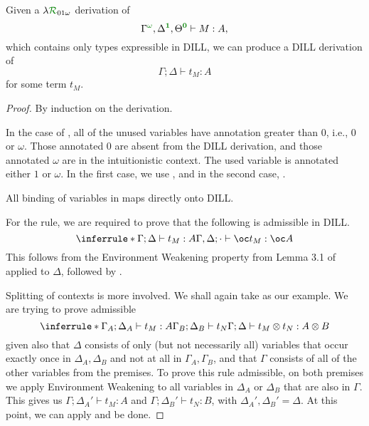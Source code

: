 \begin{proposition}
  Given a $\name_{01\omega}$ derivation of \[
    \ctx{\Gamma}{\vct \omega}, \ctx{\Delta}{\vct 1}, \ctx{\Theta}{\vct 0} \vdash
    M : A,
  \] which contains only types expressible in DILL, we can produce a DILL
  derivation of \[
    \Gamma; \Delta \vdash t_M : A
  \] for some term $t_M$.
\end{proposition}
\begin{proof}
  By induction on the derivation.

  In the case of , all of the unused variables have annotation
  greater than $0$, i.e., $0$ or $\omega$.
  Those annotated $0$ are absent from the DILL derivation, and those annotated
  $\omega$ are in the intuitionistic context.
  The used variable is annotated either $1$ or $\omega$.
  In the first case, we use , and in the second case,
  .

  All binding of variables in \name{} maps directly onto DILL.

  For the  rule, we are required to prove that the
  following is admissible in DILL.
  \[
    \inferrule*
    {\Gamma; \Delta \vdash t_M : A}
    {\Gamma, \Delta; \cdot \vdash \oc t_M : \oc A}
  \]
  This follows from the Environment Weakening property from Lemma 3.1 of
  \cite{Barber1996} applied to $\Delta$, followed by .

  Splitting of contexts is more involved.
  We shall again take  as our example.
  We are trying to prove admissible \[
    \inferrule*
    {\Gamma_A; \Delta_A \vdash t_M : A \\ \Gamma_B; \Delta_B \vdash t_N}
    {\Gamma; \Delta \vdash t_M \otimes t_N : A \otimes B}
  \] given also that $\Delta$ consists of only (but not necessarily all)
  variables that occur exactly once in $\Delta_A, \Delta_B$ and not at all in
  $\Gamma_A, \Gamma_B$, and that $\Gamma$ consists of all of the other variables
  from the premises.
  To prove this rule admissible, on both premises we apply Environment Weakening
  to all variables in $\Delta_A$ or $\Delta_B$ that are also in $\Gamma$.
  This gives us $\Gamma; \Delta_A' \vdash t_M : A$ and $\Gamma; \Delta_B' \vdash
  t_N : B$, with $\Delta_A', \Delta_B' = \Delta$.
  At this point, we can apply  and be done.
\end{proof}